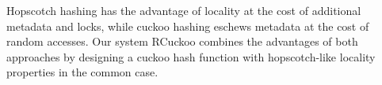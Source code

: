 Hopscotch hashing has the advantage of locality at the cost of
additional metadata and locks, while cuckoo hashing eschews metadata
at the cost of random accesses. Our system RCuckoo combines the
advantages of both approaches by designing a cuckoo hash function
with hopscotch-like locality properties in the common case.


